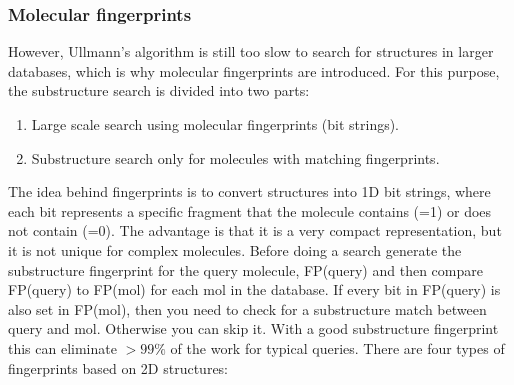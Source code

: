 %

\subsubsection{Molecular fingerprints}

However, Ullmann's algorithm is still too slow to search for structures in larger databases, which is why molecular fingerprints are introduced. For this purpose, the substructure search is divided into two parts:

\begin{enumerate}
    \item Large scale search using molecular fingerprints (bit strings).
    \item Substructure search only for molecules with matching fingerprints.
\end{enumerate}

The idea behind fingerprints is to convert structures into 1D bit strings, where each bit represents a specific fragment that the molecule contains (=1) or does not contain (=0). The advantage is that it is a very compact representation, but it is not unique for complex molecules. Before doing a search generate the substructure fingerprint for the query molecule, FP(query) and then compare FP(query) to FP(mol) for each mol in the database. If every bit in FP(query) is also set in FP(mol), then you need to check for a substructure match between query and mol. Otherwise you can skip it. With a good substructure fingerprint this can eliminate $>99\%$ of the work for typical queries. There are four types of fingerprints based on 2D structures:

